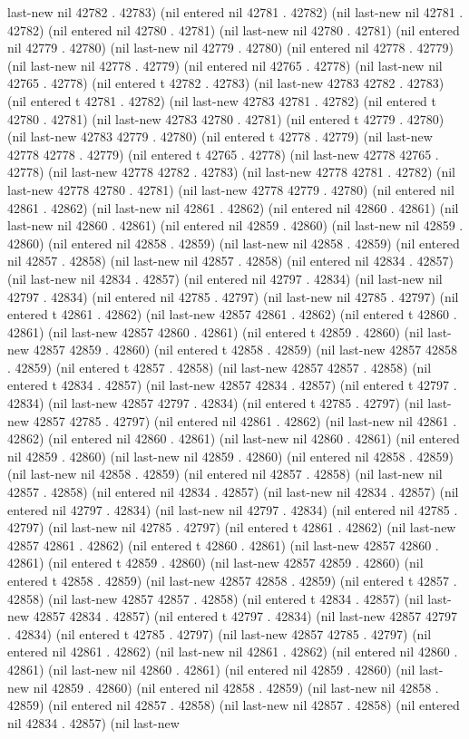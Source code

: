 last-new nil 42782 . 42783) (nil entered nil 42781 . 42782) (nil last-new nil 42781 . 42782) (nil entered nil 42780 . 42781) (nil last-new nil 42780 . 42781) (nil entered nil 42779 . 42780) (nil last-new nil 42779 . 42780) (nil entered nil 42778 . 42779) (nil last-new nil 42778 . 42779) (nil entered nil 42765 . 42778) (nil last-new nil 42765 . 42778) (nil entered t 42782 . 42783) (nil last-new 42783 42782 . 42783) (nil entered t 42781 . 42782) (nil last-new 42783 42781 . 42782) (nil entered t 42780 . 42781) (nil last-new 42783 42780 . 42781) (nil entered t 42779 . 42780) (nil last-new 42783 42779 . 42780) (nil entered t 42778 . 42779) (nil last-new 42778 42778 . 42779) (nil entered t 42765 . 42778) (nil last-new 42778 42765 . 42778) (nil last-new 42778 42782 . 42783) (nil last-new 42778 42781 . 42782) (nil last-new 42778 42780 . 42781) (nil last-new 42778 42779 . 42780) (nil entered nil 42861 . 42862) (nil last-new nil 42861 . 42862) (nil entered nil 42860 . 42861) (nil last-new nil 42860 . 42861) (nil entered nil 42859 . 42860) (nil last-new nil 42859 . 42860) (nil entered nil 42858 . 42859) (nil last-new nil 42858 . 42859) (nil entered nil 42857 . 42858) (nil last-new nil 42857 . 42858) (nil entered nil 42834 . 42857) (nil last-new nil 42834 . 42857) (nil entered nil 42797 . 42834) (nil last-new nil 42797 . 42834) (nil entered nil 42785 . 42797) (nil last-new nil 42785 . 42797) (nil entered t 42861 . 42862) (nil last-new 42857 42861 . 42862) (nil entered t 42860 . 42861) (nil last-new 42857 42860 . 42861) (nil entered t 42859 . 42860) (nil last-new 42857 42859 . 42860) (nil entered t 42858 . 42859) (nil last-new 42857 42858 . 42859) (nil entered t 42857 . 42858) (nil last-new 42857 42857 . 42858) (nil entered t 42834 . 42857) (nil last-new 42857 42834 . 42857) (nil entered t 42797 . 42834) (nil last-new 42857 42797 . 42834) (nil entered t 42785 . 42797) (nil last-new 42857 42785 . 42797) (nil entered nil 42861 . 42862) (nil last-new nil 42861 . 42862) (nil entered nil 42860 . 42861) (nil last-new nil 42860 . 42861) (nil entered nil 42859 . 42860) (nil last-new nil 42859 . 42860) (nil entered nil 42858 . 42859) (nil last-new nil 42858 . 42859) (nil entered nil 42857 . 42858) (nil last-new nil 42857 . 42858) (nil entered nil 42834 . 42857) (nil last-new nil 42834 . 42857) (nil entered nil 42797 . 42834) (nil last-new nil 42797 . 42834) (nil entered nil 42785 . 42797) (nil last-new nil 42785 . 42797) (nil entered t 42861 . 42862) (nil last-new 42857 42861 . 42862) (nil entered t 42860 . 42861) (nil last-new 42857 42860 . 42861) (nil entered t 42859 . 42860) (nil last-new 42857 42859 . 42860) (nil entered t 42858 . 42859) (nil last-new 42857 42858 . 42859) (nil entered t 42857 . 42858) (nil last-new 42857 42857 . 42858) (nil entered t 42834 . 42857) (nil last-new 42857 42834 . 42857) (nil entered t 42797 . 42834) (nil last-new 42857 42797 . 42834) (nil entered t 42785 . 42797) (nil last-new 42857 42785 . 42797) (nil entered nil 42861 . 42862) (nil last-new nil 42861 . 42862) (nil entered nil 42860 . 42861) (nil last-new nil 42860 . 42861) (nil entered nil 42859 . 42860) (nil last-new nil 42859 . 42860) (nil entered nil 42858 . 42859) (nil last-new nil 42858 . 42859) (nil entered nil 42857 . 42858) (nil last-new nil 42857 . 42858) (nil entered nil 42834 . 42857) (nil last-new 
